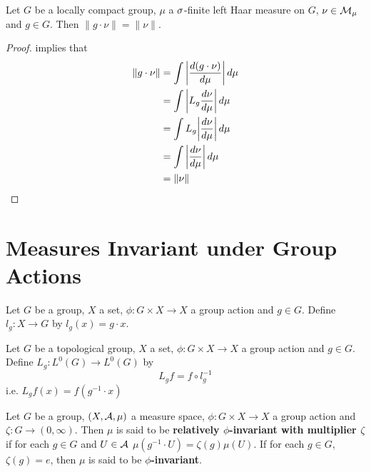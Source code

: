 \documentclass{book}
\begin{document}
	\begin{ex}
	Let $G$ be a locally compact group, $\mu$ a $\sigma$-finite left Haar measure on $G$, $\nu \in \mathcal{M}_{\mu}$ and $g \in G$. Then $\|g \cdot \nu\| = \|\nu\|$. 
	\end{ex}
	
	\begin{proof}
	 implies that
	\begin{align*}
	\|g \cdot \nu\| 
	&= \int \bigg | \frac{d (g \cdot \nu)}{d\mu} \bigg | \, d \mu \\
	&=  \int \bigg | L_g \frac{d \nu}{d\mu} \bigg | \, d \mu \\
	&= \int L_g \bigg | \frac{d \nu}{d\mu} \bigg | \, d \mu \\
	&= \int \bigg | \frac{d \nu}{d\mu} \bigg | \, d \mu \\
	&= \|\nu\|
	\end{align*}
	\end{proof}

	
	
	
	
	
	
	
	
	
	
	
	
	
	
	
	
	
	
	
	
	\newpage
	\section{Measures Invariant under Group Actions}
	\begin{defn}  
		Let $G$ be a group, $X$ a set, $\phi: G \times X \rightarrow X$ a group action and $g \in G$. Define $l_g:X \rightarrow G$ by $l_g(x) = g \cdot x$. 
	\end{defn}
	
	\begin{defn}  
		Let $G$ be a topological group, $X$ a set, $\phi: G \times X \rightarrow X$ a group action and $g \in G$. Define $L_g: L^0(G) \rightarrow L^0(G)$ by 
		$$L_g f = f \circ l_g^{-1}$$ 
		i.e. $L_g f(x) = f(g^{-1} \cdot x)$
	\end{defn}

	\begin{defn}
		Let $G$ be a group, $(X, \mathcal{A}, \mu)$ a measure space, $\phi: G \times X \rightarrow X$ a group action and $\zeta: G \rightarrow (0, \infty)$. Then $\mu$ is said to be \textbf{relatively $\phi$-invariant with multiplier $\zeta$} if for each $g \in G$ and $U \in \mathcal{A}$ $\mu(g^{-1} \cdot U) = \zeta(g) \mu(U)$. If for each $g \in G$, $\zeta(g) = e$, then $\mu$ is said to be \textbf{$\phi$-invariant}.
	\end{defn}
\end{document}
